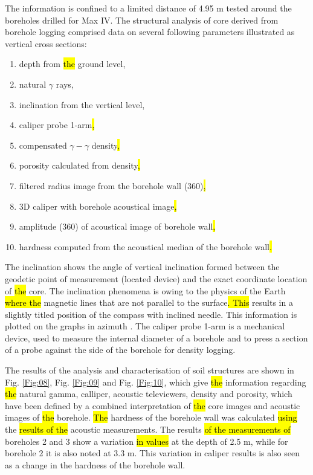 \documentclass[USenglish,twocolumn]{article}
\begin{document}
The information is confined to a limited distance of 4.95 m tested around the boreholes drilled for Max IV. The structural analysis of core derived from borehole logging comprised data on several following parameters illustrated as vertical cross sections: 

\begin{enumerate}
	\item depth from \hl{the }ground level, 
	\item natural $\gamma$ rays, 
	\item inclination from the vertical level, 
	\item caliper probe 1-arm\hl{,}
	\item compensated $\gamma-\gamma$ density\hl{,}
	\item porosity calculated from density\hl{,}
	\item filtered radius image from the borehole wall (360\degree)\hl{,}
	\item 3D caliper with borehole acoustical image\hl{,}
	\item amplitude (360\degree) of acoustical image of borehole wall\hl{,}
	\item hardness computed from the acoustical median of the borehole wall\hl{.}
\end{enumerate}

The inclination shows the angle of vertical inclination formed between the geodetic point of measurement (located device) and the exact coordinate location of \hl{the }core. The inclination phenomena is owing to the physics of the Earth\hl{ where the }magnetic lines that are not parallel to the surface\hl{. This }results in a slightly titled position of the compass with inclined\hl{ }needle. This information is plotted on the graphs in azimuth \degree. The caliper probe 1-arm is a mechanical device, used to measure the internal diameter of a borehole and to press a section of a probe against the side of the borehole for density logging.
	
The results of the analysis and characterisation of soil structures are shown in Fig. \ref{Fig:08}, Fig. \ref{Fig:09} and Fig. \ref{Fig:10}, which give \hl{the }information regarding \hl{the }natural gamma, calliper, acoustic televiewers, density and porosity, which have been defined by a combined interpretation of \hl{the }core images and acoustic images of \hl{the }borehole. \hl{The }hardness of the borehole wall was calculated \hl{using} the \hl{results of the }acoustic measurements. The results \hl{of the measurements of} boreholes 2 and 3 show a variation \hl{in values }at the depth of 2.5 m, while for borehole 2 it is also noted at 3.3 m. This variation in caliper results is also seen as a change in the hardness of the borehole wall. 
\end{document}
